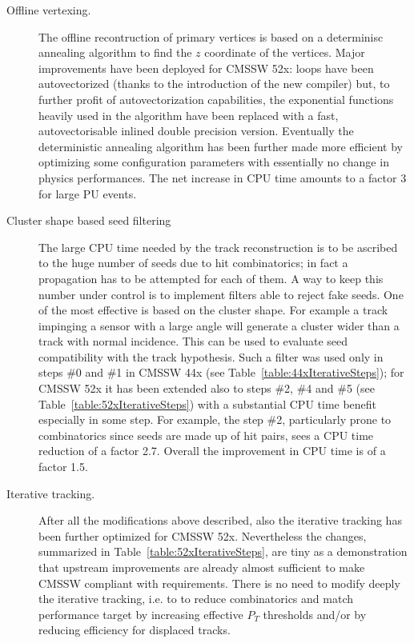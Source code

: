 \begin{description}
\item[Offline vertexing.] The offline recontruction of primary
  vertices is based on a determinisc annealing algorithm to find the
  $z$ coordinate of the vertices. Major improvements have been
  deployed for CMSSW 52x: loops have been autovectorized (thanks to
  the introduction of the new compiler) but, to further profit of
  autovectorization capabilities, the exponential functions heavily
  used in the algorithm have been replaced with a fast,
  autovectorisable inlined double precision version. Eventually the
  deterministic annealing algorithm has been further made more
  efficient by optimizing some configuration parameters
  with essentially no change in physics performances. The net increase
  in CPU time amounts to a factor 3 for large PU events.
\item[Cluster shape based seed filtering] The large CPU time needed by
  the track reconstruction is to be ascribed to the huge number of
  seeds due to hit combinatorics; in fact a propagation has to be attempted for
  each of them. A way to keep this number under control is to
  implement filters able to reject fake seeds. One of the most
  effective is based on the cluster shape. For example a track
  impinging a sensor with a large angle will generate a cluster
  wider than a track with normal incidence. This can be used to
  evaluate seed compatibility with the track hypothesis. Such a filter
  was used only in steps \#0 and \#1 in CMSSW 44x (see
  Table~\ref{table:44xIterativeSteps}); for CMSSW 52x it has been
  extended also to steps \#2, \#4 and \#5 (see
  Table~\ref{table:52xIterativeSteps}) with a substantial CPU time
  benefit especially in some step. For example, the step \#2, 
  particularly prone to combinatorics since seeds are made up of hit
  pairs, sees a CPU time reduction of a factor 2.7. Overall the
  improvement in CPU time is of a factor 1.5. 
\item[Iterative tracking.] After all the modifications above
  described, also the iterative tracking has been further optimized
  for CMSSW 52x. Nevertheless the changes, summarized in
  Table~\ref{table:52xIterativeSteps}, are tiny as a demonstration
  that upstream improvements are already almost sufficient to make
  CMSSW compliant with requirements. There is no need to modify deeply
  the iterative tracking, i.e. to to reduce combinatorics and match
  performance target by increasing effective $P_T$ thresholds and/or
  by reducing efficiency for displaced tracks. 

\end{description}

